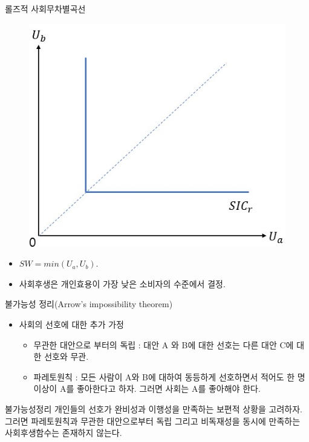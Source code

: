 \documentclass[aspectratio=169,xcolor=dvipsnames,handout]{beamer}
\begin{document}
\begin{frame}{롤즈적 사회무차별곡선}
    \begin{figure}
        \centering
        \includegraphics[scale=.4]{pic/Rawlsian.jpg}
        \label{fig:Rawlsian}
    \end{figure}
    \begin{itemize}
        \item $SW = min(U_a, U_b)$.
        \item 사회후생은 개인효용이 가장 낮은 소비자의 수준에서 결정.
    \end{itemize}
\end{frame}

\begin{frame}{불가능성 정리(Arrow's impossibility theorem)}
    \begin{itemize}
    \item 사회의 선호에 대한 추가 가정
        \begin{itemize}
            \item 무관한 대안으로 부터의 독립 : 대안 A 와 B에 대한 선호는 다른 대안 C에 대한 선호와 무관.
            \item 파레토원칙 : 모든 사람이 A와 B에 대하여 동등하게 선호하면서 적어도 한 명 이상이 A를 좋아한다고 하자. 그러면 사회는 A를 좋아해야 한다. 
        \end{itemize}
    \end{itemize}
    \begin{block}{불가능성정리}
        개인들의 선호가 완비성과 이행성을 만족하는 보편적 상황을 고려하자. \\ 그러면 파레토원칙과 무관한 대안으로부터 독립 그리고 비독재성을 동시에 만족하는 사회후생함수는 존재하지 않는다.
    \end{block}
\end{frame}
\end{document}

